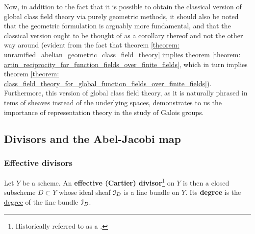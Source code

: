             Now, in addition to the fact that it is possible to obtain the classical version of global class field theory via purely geometric methods, it should also be noted that the geometric formulation is arguably more fundamental, and that the classical version ought to be thought of as a corollary thereof and not the other way around (evident from the fact that theorem \ref{theorem: unramified_abelian_geometric_class_field_theory} implies theorem \ref{theorem: artin_reciprocity_for_function_fields_over_finite_fields}, which in turn implies theorem \ref{theorem: class_field_theory_for_global_function_fields_over_finite_fields}). Furthermore, this version of global class field theory, as it is naturally phrased in tems of sheaves instead of the underlying spaces, demonstrates to us the importance of representation theory in the study of Galois groups.
    
        \subsection{Divisors and the Abel-Jacobi map}
            \subsubsection{Effective divisors}
                \begin{definition}[Divisors] \label{def: divisors}
                    Let $Y$ be a scheme. An \textbf{effective (Cartier) divisor}\footnote{Historically referred to as a .} on $Y$ is then a closed subscheme $D \subset Y$ whose ideal sheaf $\mathcal{I}_D$ is a line bundle on $Y$. Its \textbf{degree} is the \href{https://stacks.math.columbia.edu/tag/0AYQ}{\underline{degree}} of the line bundle $\mathcal{I}_D$.  
                \end{definition}
                
